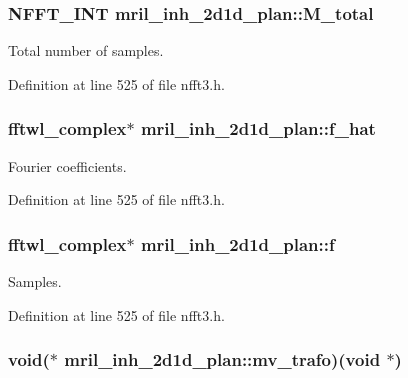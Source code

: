 \hypertarget{structmril__inh__2d1d__plan_a83a74050d6d0d32eda74ad81b9da4536}{
\subsubsection[{M\-\_\-total}]{\setlength{\rightskip}{0pt plus 5cm}N\-F\-F\-T\-\_\-\-I\-N\-T mril\-\_\-inh\-\_\-2d1d\-\_\-plan\-::\-M\-\_\-total}}\label{structmril__inh__2d1d__plan_a83a74050d6d0d32eda74ad81b9da4536}


Total number of samples. 



Definition at line 525 of file nfft3.\-h.

\hypertarget{structmril__inh__2d1d__plan_a70247e89a002d0e7b5c66d1e87b33645}{
\subsubsection[{f\-\_\-hat}]{\setlength{\rightskip}{0pt plus 5cm}fftwl\-\_\-complex$\ast$ mril\-\_\-inh\-\_\-2d1d\-\_\-plan\-::f\-\_\-hat}}\label{structmril__inh__2d1d__plan_a70247e89a002d0e7b5c66d1e87b33645}


Fourier coefficients. 



Definition at line 525 of file nfft3.\-h.

\hypertarget{structmril__inh__2d1d__plan_a3e2fef5b1bb862347511209994235597}{
\subsubsection[{f}]{\setlength{\rightskip}{0pt plus 5cm}fftwl\-\_\-complex$\ast$ mril\-\_\-inh\-\_\-2d1d\-\_\-plan\-::f}}\label{structmril__inh__2d1d__plan_a3e2fef5b1bb862347511209994235597}


Samples. 



Definition at line 525 of file nfft3.\-h.

\hypertarget{structmril__inh__2d1d__plan_a7dbc7cd7b733b5850a59f35aa0f959d1}{
\subsubsection[{mv\-\_\-trafo}]{\setlength{\rightskip}{0pt plus 5cm}void($\ast$ mril\-\_\-inh\-\_\-2d1d\-\_\-plan\-::mv\-\_\-trafo)(void $\ast$)}}\label{structmril__inh__2d1d__plan_a7dbc7cd7b733b5850a59f35aa0f959d1}



